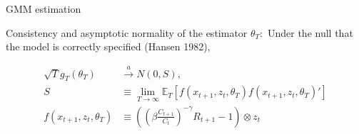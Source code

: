 \documentclass[xcolor=table, aspectratio=169]{beamer}
\newcommand{\E}{\mathbb{E}}
\begin{document}



\begin{frame}{GMM estimation}

Consistency and asymptotic normality of the estimator $\theta_T:$ Under the null that the model is correctly specified (Hansen 1982),

\begin{align*}
\sqrt{T} g_T(\theta_T) &\overset{a}{\rightarrow} N(0,S), \\
S &\equiv \lim_{T\rightarrow \infty} \E_T[f(x_{t+1},z_t,\theta_T) f(x_{t+1},z_t,\theta_T)'] \\
f(x_{t+1},z_t,\theta_T) &\equiv \left( \left( \beta \frac{C_{t+1}}{C_t}\right)^{-\gamma} R_{t+1}-1\right) \otimes z_t
\end{align*}


\end{frame}
\end{document}
